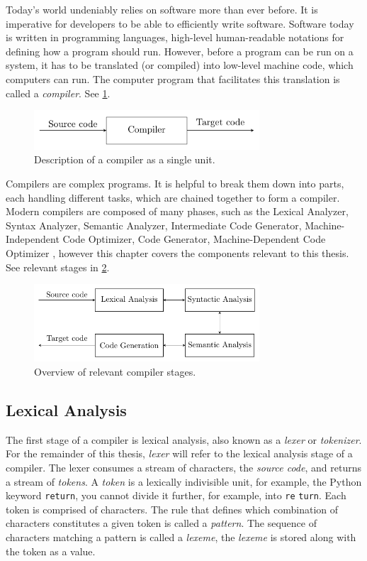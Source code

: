 Today's world undeniably relies on software more than ever before. It is imperative for developers to be able to efficiently write software. Software today is written in programming languages, high-level human-readable notations for defining how a program should run. However, before a program can be run on a system, it has to be translated (or compiled) into low-level machine code, which computers can run. The computer program that facilitates this translation is called a \emph{compiler}. See \cref{fig:compiler}.

\begin{figure}[h]
  \caption{Description of a compiler as a single unit.}
  \label{fig:compiler}
  \centering
  \includegraphics[width=0.75\textwidth]{figures/compiler.pdf}
\end{figure}



Compilers are complex programs. It is helpful to break them down into parts, each handling different tasks, which are chained together to form a compiler. Modern compilers are composed of many phases, such as the Lexical Analyzer, Syntax Analyzer, Semantic Analyzer, Intermediate Code Generator, Machine-Independent Code Optimizer, Code Generator, Machine-Dependent Code Optimizer \cite[p. 5]{dragon}, however this chapter covers the components relevant to this thesis. See relevant stages in \cref{fig:compiler-stages}.


\begin{figure}[h]
  \caption{Overview of relevant compiler stages.}
  \label{fig:compiler-stages}
  \centering
  \includegraphics[width=0.75\textwidth]{figures/compiler-stages.pdf}
\end{figure}

\subsection*{Lexical Analysis}
The first stage of a compiler is lexical analysis, also known as a \emph{lexer} or \emph{tokenizer}. For the remainder of this thesis, \emph{lexer} will refer to the lexical analysis stage of a compiler. The lexer consumes a stream of characters, the \emph{source code}, and returns a stream of \emph{tokens}. A \emph{token} is a lexically indivisible unit, for example, the Python keyword \texttt{return}, you cannot divide it further, for example, into \texttt{re} \texttt{turn}. Each token is comprised of characters. The rule that defines which combination of characters constitutes a given token is called a \emph{pattern}. The sequence of characters matching a pattern is called a \emph{lexeme}, the \emph{lexeme} is stored along with the token as a value.

